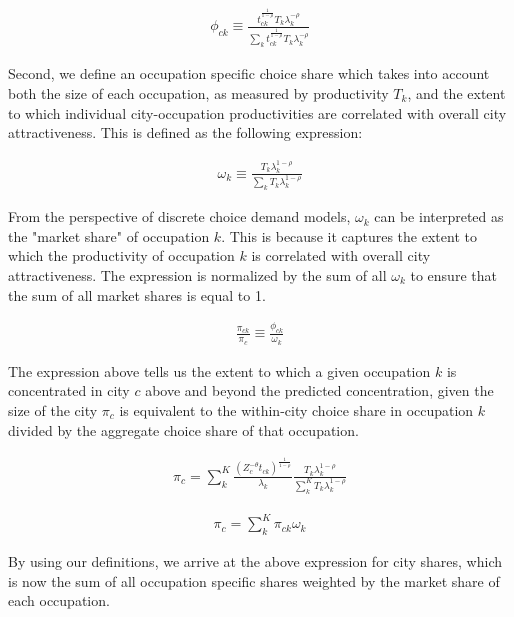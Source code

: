 \documentclass[10pt]{article}
\begin{document}
\begin{align*}
    \phi_{ck} \equiv \frac{{t^{\frac{1}{1-\rho}}_{ck}}{T_{k}}\lambda_{k}^{-\rho}}{\sum\limits_{k}{t^{\frac{1}{1-\rho}}_{ck}}{T_{k}}\lambda_{k}^{-\rho}}
\end{align*}

Second, we define an occupation specific choice share which takes into account both the size of each occupation, as measured by productivity $T_k$, and the extent to which individual city-occupation productivities are correlated with overall city attractiveness. This is defined as the following expression:

\begin{align*}
    \omega_k \equiv \frac{{T_{k}}\lambda_{k}^{1-\rho}}{\sum\limits_{k}{T_{k}}\lambda_{k}^{1-\rho}}
\end{align*}

From the perspective of discrete choice demand models, $\omega_k$ can be interpreted as the "market share" of occupation $k$. This is because it captures the extent to which the productivity of occupation $k$ is correlated with overall city attractiveness. The expression is normalized by the sum of all $\omega_k$ to ensure that the sum of all market shares is equal to 1.

\begin{align}
    \frac{\pi_{ck}}{\pi_c}\equiv \frac{\phi_{ck}}{\omega_k}
    \label{identity}
\end{align}

The expression above tells us the extent to which a given occupation $k$ is concentrated in city $c$ above and beyond the predicted concentration, given the size of the city $\pi_c$ is equivalent to the within-city choice share in occupation $k$ divided by the aggregate choice share of that occupation.

\begin{align*}
    \pi_{c} = \sum_{k}^{K} \frac{(Z_{c}^{-\theta} t_{ck})^{\frac{1}{1-\rho}}}{\lambda_k} \frac{T_k \lambda_{k}^{1 - \rho}}{\sum \limits_{k}^{K} T_k \lambda_{k}^{1-\rho}}
\end{align*}

\begin{align}
    \pi_c = \sum_{k}^{K} \pi_{ck} \omega_k
\end{align}

By using our definitions, we arrive at the above expression for city shares, which is now the sum of all occupation specific shares weighted by the market share of each occupation.
\end{document}
